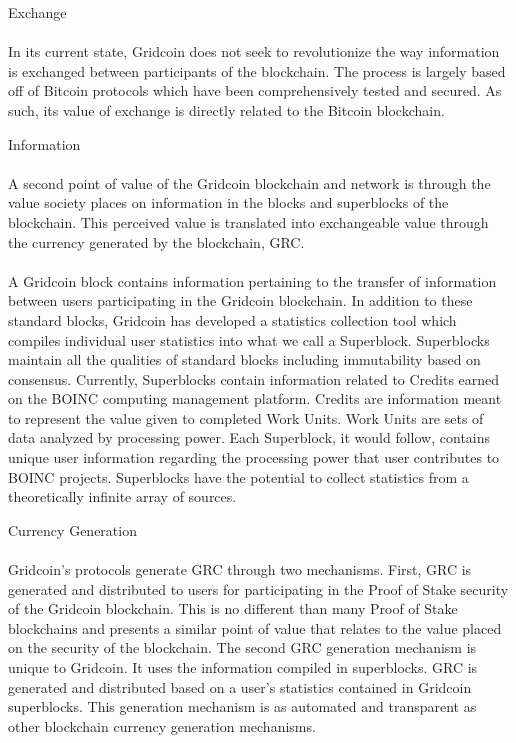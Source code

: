 \begin{compactenum}
	\item Exchange
\\ \\
In its current state, Gridcoin does not seek to revolutionize the way information is exchanged between participants of the blockchain.  The process is largely based off of Bitcoin protocols which have been comprehensively tested and secured.  As such, its value of exchange is directly related to the Bitcoin blockchain.
\\
	\item Information
\\ \\
A second point of value of the Gridcoin blockchain and network is through the value society places on information in the blocks and superblocks of the blockchain.  This perceived value is translated into exchangeable value through the currency generated by the blockchain, GRC.
\\ \\
A Gridcoin block contains information pertaining to the transfer of information between users participating in the Gridcoin blockchain.  In addition to these standard blocks, Gridcoin has developed a statistics collection tool which compiles individual user statistics into what we call a  Superblock.  Superblocks maintain all the qualities of standard blocks including immutability based on consensus.  Currently, Superblocks contain information related to Credits earned on the BOINC computing management platform.  Credits are information meant to represent the value given to completed Work Units.  Work Units are sets of data analyzed by processing power.  Each Superblock, it would follow, contains unique user information regarding the processing power that user contributes to BOINC projects.  Superblocks have the potential to collect statistics from a theoretically infinite array of sources.
\\
	\item Currency Generation
\\ \\
Gridcoin’s protocols generate GRC through two mechanisms.  First, GRC is generated and distributed to users for participating in the Proof of Stake security of the Gridcoin blockchain.  This is no different than many Proof of Stake blockchains and presents a similar point of value that relates to the value placed on the security of the blockchain.  The second GRC generation mechanism is unique to Gridcoin.  It uses the information compiled in superblocks.  GRC is generated and distributed based on a user’s statistics contained in Gridcoin superblocks.  This generation mechanism is as automated and transparent as other blockchain currency generation mechanisms.

\end{compactenum}

